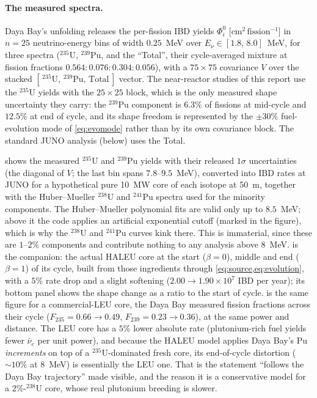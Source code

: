 \documentclass[aps,prd,superscriptaddress,nofootinbib,longbibliography,notitlepage,11pt]{revtex4-2}
\begin{document}
\paragraph{The measured spectra.}
Daya Bay's unfolding \cite{DayaBay:2021dqj} releases the per-fission IBD yields
$\Phi^0_i$ [$\mathrm{cm^2\,fission^{-1}}$] in $n=25$ neutrino-energy bins of width
$0.25$~MeV over $E_\nu\in[1.8,\,8.0]$~MeV, for three spectra ($^{235}$U, $^{239}$Pu, and
the ``Total'', their cycle-averaged mixture at fission fractions
$0.564:0.076:0.304:0.056$), with a $75\times75$ covariance $V$ over the stacked
$[\,^{235}\mathrm{U},\,^{239}\mathrm{Pu},\,\mathrm{Total}\,]$ vector.  The near-reactor
studies of this report use the $^{235}$U yields with the $25\times25$ block, which is the
only measured shape uncertainty they carry: the $^{239}$Pu component is $6.3\%$ of fissions
at mid-cycle and $12.5\%$ at end of cycle, and its shape freedom is represented by the
$\pm30\%$ fuel-evolution mode of \cref{eq:evomode} rather than by its own covariance block.
The standard JUNO analysis (below) uses the Total.

 shows the measured $^{235}$U and $^{239}$Pu yields with their released
$1\sigma$ uncertainties (the diagonal of $V$; the last bin spans $7.8$--$9.5$~MeV),
converted into IBD rates at JUNO for a hypothetical pure 10~MW core of each isotope at
50~m, together with the Huber--Mueller $^{238}$U and $^{241}$Pu spectra used for the
minority components.  The Huber--Mueller polynomial fits are valid only up to $8.5$~MeV;
above it the code applies an artificial exponential cutoff (marked in the figure), which is
why the $^{238}$U and $^{241}$Pu curves kink there.  This is immaterial, since these are
$1$--$2\%$ components and contribute nothing to any analysis above 8~MeV.
 is the companion: the actual HALEU core at the start ($\beta=0$),
middle and end ($\beta=1$) of its cycle, built from those ingredients through
\cref{eq:source,eq:evolution}, with a $5\%$ rate drop and a slight softening
($2.00\to1.90\times10^7$ IBD per year); its bottom panel shows the shape change as a ratio
to the start of cycle.   is the same figure for a commercial-LEU core,
the Daya Bay measured fission fractions across their cycle ($F_{235}=0.66\to0.49$,
$F_{239}=0.23\to0.36$), at the same power and distance.  The LEU core has a $5\%$ lower
absolute rate (plutonium-rich fuel yields fewer $\bar\nu_e$ per unit power), and because
the HALEU model applies Daya Bay's Pu \emph{increments} on top of a $^{235}$U-dominated
fresh core, its end-of-cycle distortion ($\sim10\%$ at 8~MeV) is essentially the LEU one.
That is the statement ``follows the Daya Bay trajectory'' made visible, and the reason it
is a conservative model for a $2\%$-$^{238}$U core, whose real plutonium breeding is slower.
\end{document}
